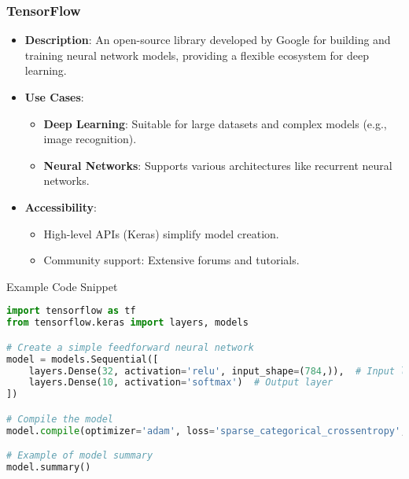 \documentclass[aspectratio=169]{beamer}
\begin{document}
\begin{frame}[fragile]
    \frametitle{TensorFlow}
    \begin{itemize}
        \item \textbf{Description}: An open-source library developed by Google for building and training neural network models, providing a flexible ecosystem for deep learning.
        
        \item \textbf{Use Cases}:
        \begin{itemize}
            \item \textbf{Deep Learning}: Suitable for large datasets and complex models (e.g., image recognition).
            \item \textbf{Neural Networks}: Supports various architectures like recurrent neural networks.
        \end{itemize}

        \item \textbf{Accessibility}:
        \begin{itemize}
            \item High-level APIs (Keras) simplify model creation.
            \item Community support: Extensive forums and tutorials.
        \end{itemize}
    \end{itemize}
    
    \begin{block}{Example Code Snippet}
    \begin{lstlisting}[language=Python]
import tensorflow as tf
from tensorflow.keras import layers, models

# Create a simple feedforward neural network
model = models.Sequential([
    layers.Dense(32, activation='relu', input_shape=(784,)),  # Input layer
    layers.Dense(10, activation='softmax')  # Output layer
])

# Compile the model
model.compile(optimizer='adam', loss='sparse_categorical_crossentropy', metrics=['accuracy'])

# Example of model summary
model.summary()
    \end{lstlisting}
    \end{block}
\end{frame}
\end{document}
